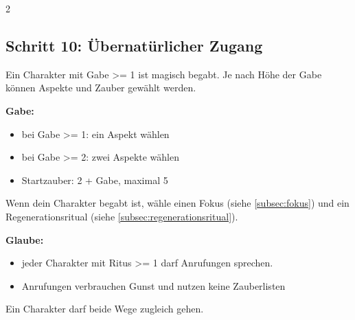 \begin{multicols*}{2}
\subsection{Schritt 10: Übernatürlicher Zugang}\label{subsec:schritt-10:-ubernaturlicher-zugang}

Ein Charakter mit Gabe >= 1 ist magisch begabt.
Je nach Höhe der Gabe können Aspekte und Zauber gewählt werden.

\textbf{Gabe:}
\begin{itemize}[leftmargin=*]
\item bei Gabe >= 1: ein Aspekt wählen
\item bei Gabe >= 2: zwei Aspekte wählen
\item Startzauber: 2 + Gabe, maximal 5
\end{itemize}

Wenn dein Charakter begabt ist, wähle einen Fokus (siehe \cref{subsec:fokus}) und ein Regenerationsritual (siehe \cref{subsec:regenerationsritual}).

\textbf{Glaube:}
\begin{itemize}[leftmargin=*]
\item jeder Charakter mit Ritus >= 1 darf Anrufungen sprechen.
\item Anrufungen verbrauchen Gunst und nutzen keine Zauberlisten
\end{itemize}

Ein Charakter darf beide Wege zugleich gehen.
\end{multicols*}
